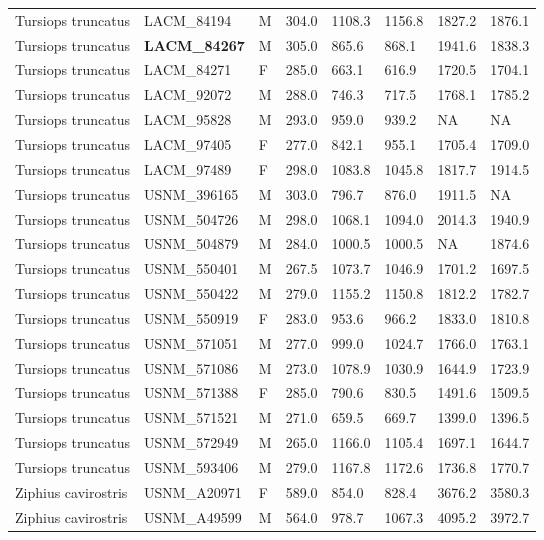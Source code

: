 \begin{longtable}{|p{1.95in}p{1.1in}p{.15in}p{.4in}p{.4in}p{.4in}p{.4in}p{.4in}|}
  Tursiops truncatus & LACM\_84194 & M & 304.0 & 1108.3 & 1156.8 & 1827.2 & 1876.1 \\ 
  Tursiops truncatus & \textbf{ LACM\_84267 } & M & 305.0 & 865.6 & 868.1 & 1941.6 & 1838.3 \\ 
  Tursiops truncatus & LACM\_84271 & F & 285.0 & 663.1 & 616.9 & 1720.5 & 1704.1 \\ 
  Tursiops truncatus & LACM\_92072 & M & 288.0 & 746.3 & 717.5 & 1768.1 & 1785.2 \\ 
  Tursiops truncatus & LACM\_95828 & M & 293.0 & 959.0 & 939.2 & NA & NA  \\ 
  Tursiops truncatus & LACM\_97405 & F & 277.0 & 842.1 & 955.1 & 1705.4 & 1709.0 \\ 
  Tursiops truncatus & LACM\_97489 & F & 298.0 & 1083.8 & 1045.8 & 1817.7 & 1914.5 \\ 
  Tursiops truncatus & USNM\_396165 & M & 303.0 & 796.7 & 876.0 & 1911.5 & NA  \\ 
  Tursiops truncatus & USNM\_504726 & M & 298.0 & 1068.1 & 1094.0 & 2014.3 & 1940.9 \\ 
  Tursiops truncatus & USNM\_504879 & M & 284.0 & 1000.5 & 1000.5 & NA & 1874.6 \\ 
  Tursiops truncatus & USNM\_550401 & M & 267.5 & 1073.7 & 1046.9 & 1701.2 & 1697.5 \\ 
  Tursiops truncatus & USNM\_550422 & M & 279.0 & 1155.2 & 1150.8 & 1812.2 & 1782.7 \\ 
  Tursiops truncatus & USNM\_550919 & F & 283.0 & 953.6 & 966.2 & 1833.0 & 1810.8 \\ 
  Tursiops truncatus & USNM\_571051 & M & 277.0 & 999.0 & 1024.7 & 1766.0 & 1763.1 \\ 
  Tursiops truncatus & USNM\_571086 & M & 273.0 & 1078.9 & 1030.9 & 1644.9 & 1723.9 \\ 
  Tursiops truncatus & USNM\_571388 & F & 285.0 & 790.6 & 830.5 & 1491.6 & 1509.5 \\ 
  Tursiops truncatus & USNM\_571521 & M & 271.0 & 659.5 & 669.7 & 1399.0 & 1396.5 \\ 
  Tursiops truncatus & USNM\_572949 & M & 265.0 & 1166.0 & 1105.4 & 1697.1 & 1644.7 \\ 
  Tursiops truncatus & USNM\_593406 & M & 279.0 & 1167.8 & 1172.6 & 1736.8 & 1770.7 \\ 
  Ziphius cavirostris & USNM\_A20971 & F & 589.0 & 854.0 & 828.4 & 3676.2 & 3580.3 \\ 
  Ziphius cavirostris & USNM\_A49599 & M & 564.0 & 978.7 & 1067.3 & 4095.2 & 3972.7 \\ 
   \hline
\end{longtable}

\normalfont
